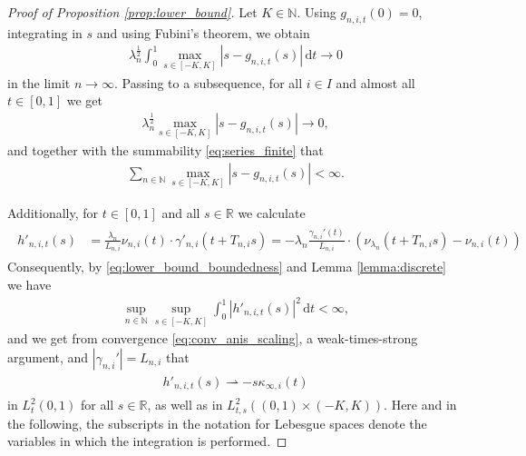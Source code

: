 \documentclass[11pt]{article}
\numberwithin{statement}{section}
\numberwithin{equation}{section}
\theoremstyle{remark}
\newcommand{\R}{\mathbb R} 				%
\newcommand{\N}{\mathbb N}
\newcommand{\intd}{\, \mathrm{d}} 				%
\newcommand{\warr}{\rightharpoonup}				%
\begin{document}
\begin{proof}[Proof of Proposition \ref{prop:lower_bound}]
	Let $K \in \N$.  Using
        $g_{n,i,t}(0) =0$, integrating in $s$ and using Fubini's
        theorem, we obtain
	\begin{align}
          \lambda_n^\frac{1}{2} \int_0^1 \max_{s \in [-K,K]} | s -
          g_{n,i,t}(s) | \intd t \to 0 
	\end{align}
	in the limit $n \to \infty$.  Passing to a subsequence, for
        all $i \in I$ and almost all $t \in [0,1]$ we get
	\begin{align}\label{eq:conv_tangents}
		\lambda_n^\frac{1}{2} \max_{s \in [-K,K]} | s - g_{n,i,t}(s) | \to 0,
	\end{align}
	and together with the summability \eqref{eq:series_finite}
        that 
	\begin{align}\label{eq:another_fucking_Borel_Cantelli}
		\sum_{n\in \N}  \max_{s \in [-K,K]} | s - g_{n,i,t}(s) | < \infty.
	\end{align}	

	Additionally, for $t\in [0,1]$ and all $s \in \R$ we
        calculate
	  \begin{align}
           \begin{split}
             h'_{n,i,t}(s)& = \frac{\lambda_n}{L_{n,i}} \nu_{n,i}(t)
             \cdot \gamma'_{n,i}(t +T_{n,i} s )
              = -\lambda_n \frac{ \gamma_{n,i}'(t)}{L_{n,i}} \cdot (
             \nu_{\lambda_n}(t +T_{n,i} s) - \nu_{n,i}(t))
           \end{split}
	\end{align}
        Consequently, by \eqref{eq:lower_bound_boundedness} and
        Lemma \ref{lemma:discrete} we have
	\begin{align}
          \sup_{n\in \N} \sup_{s\in [-K,K]} \int_{0}^{1}
          |h'_{n,i,t}(s)|^2 \intd t < \infty, 
	\end{align}
	and we get from convergence \eqref{eq:conv_anis_scaling}, a
        weak-times-strong argument, and $|\gamma_{n,i}'| = L_{n,i}$
        that
         \begin{align}\label{eq:conv_double}
           \begin{split}
             h'_{n,i,t}(s)            \warr- s
             \kappa_{\infty,i}(t)
           \end{split}
	\end{align}
	in $L_t^2(0,1)$ for all $s\in \R$, as well as in
        $L_{t,s}^2((0,1)\times (-K,K) )$. Here and in the following,
        the subscripts in the notation for Lebesgue spaces denote the
        variables in which the integration is performed.
   

\end{proof}
\end{document}
